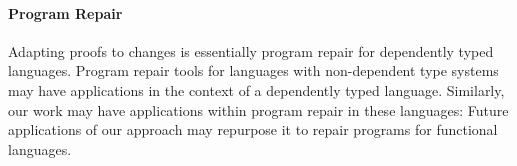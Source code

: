 \paragraph{Program Repair} Adapting proofs to changes is essentially program repair
for dependently typed languages. 
Program repair tools for 
languages with non-dependent type 
systems~\cite{Pei:2014:APR:2731750.2731779, Long:2016:APG:2837614.2837617, Le:2017:SSS:3106237.3106309, Mechtaev:2016:ASM:2884781.2884807, Monperrus2015} 
may have applications in the context of a dependently typed language.
Similarly, our work may have applications within program repair in these languages:
Future applications of our approach may repurpose it to repair programs for functional languages.



